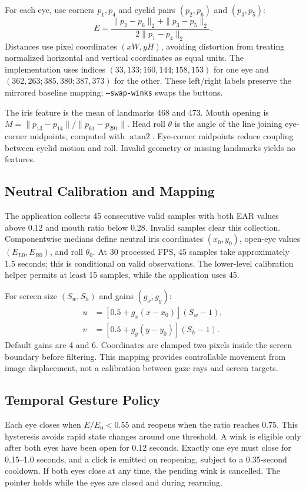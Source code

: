 \documentclass[10pt,twocolumn,letterpaper]{article}
\begin{document}
For each eye, use corners $p_1,p_4$ and eyelid pairs $(p_2,p_6)$ and $(p_3,p_5)$:
\begin{equation}
E=\frac{\|p_2-p_6\|_2+\|p_3-p_5\|_2}{2\|p_1-p_4\|_2}.
\end{equation}
Distances use pixel coordinates $(xW,yH)$, avoiding distortion from treating normalized horizontal and vertical coordinates as equal units. The implementation uses indices $(33,133;160,144;158,153)$ for one eye and $(362,263;385,380;387,373)$ for the other. These left/right labels preserve the mirrored baseline mapping; \texttt{--swap-winks} swaps the buttons.

The iris feature is the mean of landmarks 468 and 473. Mouth opening is $M=\|p_{13}-p_{14}\|/\|p_{61}-p_{291}\|$. Head roll $\theta$ is the angle of the line joining eye-corner midpoints, computed with $\operatorname{atan2}$. Eye-corner midpoints reduce coupling between eyelid motion and roll. Invalid geometry or missing landmarks yields no features.

\subsection{Neutral Calibration and Mapping}
The application collects 45 consecutive valid samples with both EAR values above 0.12 and mouth ratio below 0.28. Invalid samples clear this collection. Componentwise medians define neutral iris coordinates $(x_0,y_0)$, open-eye values $(E_{L0},E_{R0})$, and roll $\theta_0$. At 30 processed FPS, 45 samples take approximately 1.5 seconds; this is conditional on valid observations. The lower-level calibration helper permits at least 15 samples, while the application uses 45.

For screen size $(S_w,S_h)$ and gains $(g_x,g_y)$:
\begin{align}
u&=[0.5+g_x(x-x_0)](S_w-1),\\
v&=[0.5+g_y(y-y_0)](S_h-1).
\end{align}
Default gains are 4 and 6. Coordinates are clamped two pixels inside the screen boundary before filtering. This mapping provides controllable movement from image displacement, not a calibration between gaze rays and screen targets.

\subsection{Temporal Gesture Policy}
Each eye closes when $E/E_0<0.55$ and reopens when the ratio reaches 0.75. This hysteresis avoids rapid state changes around one threshold. A wink is eligible only after both eyes have been open for 0.12 seconds. Exactly one eye must close for 0.15--1.0 seconds, and a click is emitted on reopening, subject to a 0.35-second cooldown. If both eyes close at any time, the pending wink is cancelled. The pointer holds while the eyes are closed and during rearming.
\end{document}
